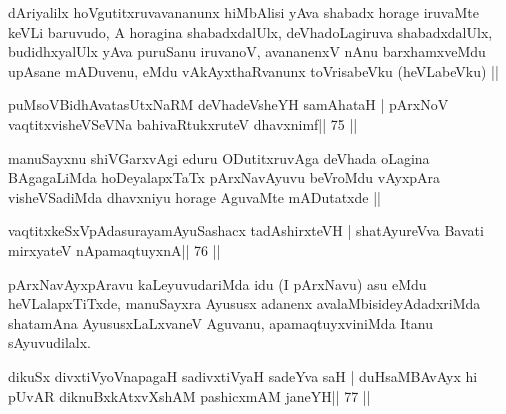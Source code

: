 \begin{artha}
dAriyalilx hoVgutitxruvavananunx hiMbAlisi yAva shabadx horage iruvaMte keVLi baruvudo, A horagina shabadxdalUlx, deVhadoLagiruva shabadxdalUlx, budidhxyalUlx yAva puruSanu iruvanoV, avananenxV nAnu barxhamxveMdu upAsane mADuvenu, eMdu vAkAyxthaRvanunx toVrisabeVku (heVLabeVku) ||
\end{artha} 
 

\begin{shl}
puMsoV\s BidhAvatasUtxNaRM deVhadeVsheYH samAhataH |
pArxNoV vaqtitxvisheVSeVNa bahivaRtukxruteV dhavxnimf\hfill || 75 ||
\end{shl}

\begin{artha}
manuSayxnu shiVGarxvAgi eduru ODutitxruvAga deVhada oLagina BAgagaLiMda hoDeyalapxTaTx pArxNavAyuvu beVroMdu vAyxpAra visheVSadiMda dhavxniyu horage AguvaMte mADutatxde ||
\end{artha} 
 

\begin{shl}
\footnotemark[9]vaqtitxkeSxVpAdasurayamAyuSashacx tadAshirxteVH |
shatAyureVva Bavati mirxyateV nApamaqtuyxnA\hfill || 76 ||
\end{shl}

\begin{artha}
pArxNavAyxpAravu kaLeyuvudariMda idu (I pArxNavu) asu eMdu heVLalapxTiTxde, manuSayxra Ayususx adanenx avalaMbisideyAdadxriMda shatamAna AyususxLaLxvaneV Aguvanu, apamaqtuyxviniMda Itanu sAyuvudilalx.
\end{artha}


\begin{shl}
dikuSx divxtiVyoV\s napagaH sadivxtiVyaH sadeYva saH |
duHsaMBAvAyx hi pUvAR diknuBxkAtxvX\s\s shAM pashicxmAM janeYH\hfill || 77 ||
\end{shl}

